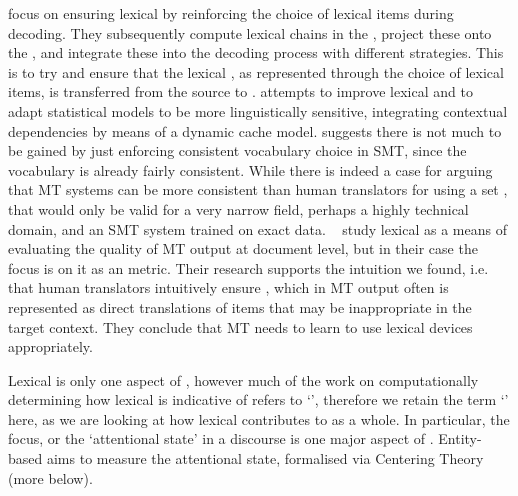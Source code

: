 \documentclass[output=paper]{langsci/langscibook.cls}
\begin{document}
\citet{Xiong:2013} focus on ensuring lexical  by reinforcing the choice of lexical items during decoding. They subsequently compute lexical chains in the  \citep{Xiong:2013b}, project these onto the , and integrate these into the decoding process with different strategies. This is to try and ensure that the lexical , as represented through the choice of lexical items, is transferred from the source to . 
\citet{Tiedemann:2010} attempts to improve lexical  and to adapt statistical models to be more linguistically sensitive, integrating contextual dependencies by means of a dynamic cache model. 
\citet{Hardmeier:2012} suggests there is not much to be gained by just enforcing consistent vocabulary choice in SMT, since the vocabulary is already fairly consistent.
  While there is indeed a case for arguing that MT systems can be more consistent than human translators for using a set  \citep{CarpuatSimard}, that would only be valid for a very narrow field, perhaps a highly technical domain, and an SMT system trained on exact data.  
~\citet{WongKit} study lexical  as a means of evaluating the quality of MT output at document level, but in their case the focus is on it as an  metric. Their research supports the intuition we found, i.e. that human translators intuitively ensure , which in MT output often is represented as direct translations of  items that may be inappropriate in the target context. They conclude that MT needs to learn to use lexical  devices appropriately. 

Lexical  is only one aspect of , however much of the work on computationally determining how lexical  is indicative of  refers to `', therefore we retain the term `' here, as we are looking at how lexical  contributes to  as a whole. In particular, the focus, or the `attentional state' \citep{Grosz:1986} in a discourse is one major aspect of . 
Entity-based  aims to measure the attentional state, formalised via Centering Theory \citep{Grosz:1995} (more below).
\end{document}
